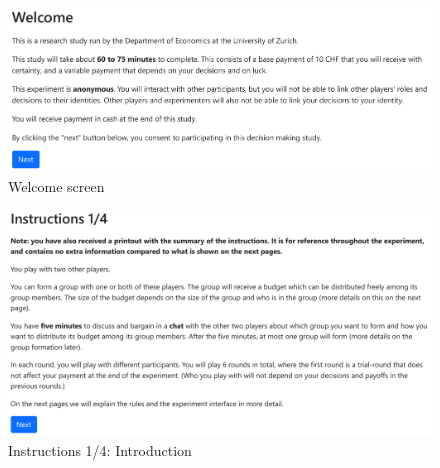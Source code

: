 \documentclass[12pt]{article}
\begin{document}
\begin{figure}[!htb]
    \centering
    \includegraphics[width=.9\linewidth]{screenshots/welcome.pdf}
    \caption{Welcome screen}
\end{figure}

\begin{figure}[!htb]
    \centering
    \includegraphics[width=.9\linewidth]{screenshots/instructions_1.pdf}
    \caption{Instructions 1/4: Introduction}
\end{figure}
\end{document}

